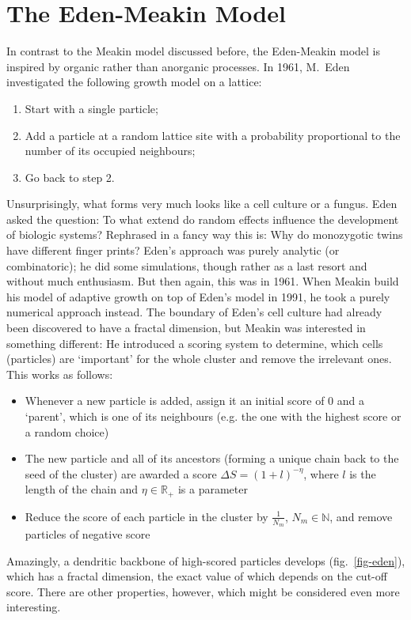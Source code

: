\documentclass[twocolumn,10pt]{scrartcl}
\begin{document}
    \section{The Eden-Meakin Model}
        In contrast to the Meakin model discussed before, the Eden-Meakin model is inspired by organic rather than
        anorganic processes. In 1961, M.~Eden investigated the following growth model on a lattice:
        \begin{enumerate}
            \item Start with a single particle;
            \item Add a particle at a random lattice site with a probability proportional to the number of its
                occupied neighbours;
            \item Go back to step 2.
        \end{enumerate}
        Unsurprisingly, what forms very much looks like a cell culture or a fungus. Eden asked the question:
        To what extend do random effects influence the development of biologic systems? Rephrased in a fancy
        way this is: Why do monozygotic twins have different finger prints? Eden's approach was purely analytic
        (or combinatoric); he did some simulations, though rather as a last resort and without much enthusiasm.
        But then again, this was in 1961. When Meakin build his model of adaptive growth on top of Eden's model
        in 1991, he took a purely numerical approach instead. The boundary of Eden's cell culture had already
        been discovered to have a fractal dimension, but Meakin was interested in something different: He
        introduced a scoring system to determine, which cells (particles) are `important' for the whole cluster
        and remove the irrelevant ones. This works as follows:
        \begin{itemize}
            \item Whenever a new particle is added, assign it an initial score of 0 and a `parent', which is
                one of its neighbours (e.g. the one with the highest score or a random choice)
            \item The new particle and all of its ancestors (forming a unique chain back to the seed of the
                cluster) are awarded a score $\Delta S=(1+l)^{-\eta}$, where $l$ is the length of the chain
                and $\eta\in\mathbb{R}_+$ is a parameter
            \item Reduce the score of each particle in the cluster by $\frac{1}{N_m}$, $N_m\in\mathbb{N}$,
                and remove particles of negative score
        \end{itemize}
        Amazingly, a dendritic backbone of high-scored particles develops (fig.~\ref{fig-eden}), which has a
        fractal dimension,
        the exact value of which depends on the cut-off score. There are other properties, however, which
        might be considered even more interesting.
\end{document}
